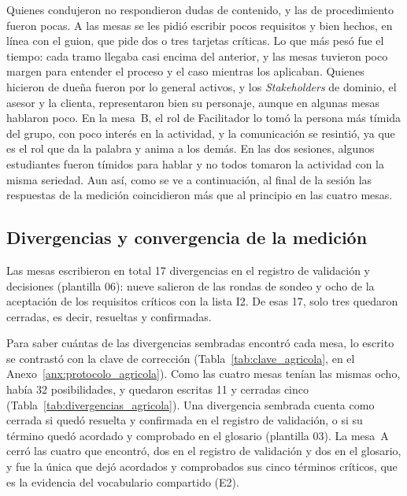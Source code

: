 \documentclass[12pt,letterpaper,oneside]{report}
\begin{document}
Quienes condujeron no respondieron dudas de contenido, y las de procedimiento
fueron pocas. A las mesas se les pidió escribir pocos requisitos y bien hechos,
en línea con el guion, que pide dos o tres tarjetas críticas. Lo que más pesó fue
el tiempo: cada tramo llegaba casi encima del anterior, y las mesas tuvieron poco
margen para entender el proceso y el caso mientras los aplicaban. Quienes
hicieron de dueña fueron por lo general activos, y los \textit{Stakeholders} de
dominio, el asesor y la clienta, representaron bien su personaje, aunque en
algunas mesas hablaron poco. En la mesa~B, el rol de Facilitador lo tomó la
persona más tímida del grupo, con poco interés en la actividad, y la
comunicación se resintió, ya que es el rol que da la palabra y anima a los
demás. En las dos sesiones, algunos estudiantes fueron tímidos para hablar y no
todos tomaron la actividad con la misma seriedad. Aun así, como se ve a
continuación, al final de la sesión las respuestas de la medición coincidieron
más que al principio en las cuatro mesas.

\subsection{Divergencias y convergencia de la medición}
Las mesas escribieron en total 17 divergencias en el registro de validación y
decisiones (plantilla 06): nueve salieron de las rondas de sondeo y ocho de la
aceptación de los requisitos críticos con la lista I2. De esas 17, solo tres
quedaron cerradas, es decir, resueltas y confirmadas.

Para saber cuántas de las divergencias sembradas encontró cada mesa, lo escrito
se contrastó con la clave de corrección (Tabla~\ref{tab:clave_agricola}, en el
Anexo~\ref{anx:protocolo_agricola}). Como
las cuatro mesas tenían las mismas ocho, había 32 posibilidades, y quedaron
escritas 11 y cerradas cinco (Tabla~\ref{tab:divergencias_agricola}). Una
divergencia sembrada cuenta como cerrada si quedó resuelta y confirmada en el
registro de validación, o si su término quedó acordado y comprobado en el
glosario (plantilla 03). La mesa~A cerró las cuatro que encontró, dos en el
registro de validación y dos en el glosario, y fue la única que dejó acordados y
comprobados sus cinco términos críticos, que es la evidencia del vocabulario
compartido (E2).
\end{document}
